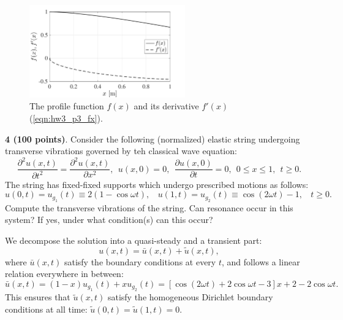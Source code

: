 \begin{figure}[!ht]
    \centering
    \includegraphics[width=0.6\textwidth]{homework/hw3/assets/hw3_p3_fx.pdf}
    \caption{The profile function $f(x)$ and its derivative $f'(x)$ (\cref{eqn:hw3_p3_fx}).}
    \label{fig:hw3_p3_fx}
\end{figure}

\newpage
\begin{problem}
    \textbf{4 (100 points)}. Consider the following (normalized) elastic string undergoing transverse vibrations governed by teh classical wave equation:
    \begin{equation}
        \frac{\partial^2 u(x, t)}{\partial t^2} = \frac{\partial^2 u(x, t)}{\partial x^2}, ~~ u(x, 0) = 0, ~~ \frac{\partial u(x, 0)}{\partial t} = 0, ~~ 0 \leq x \leq 1, ~~ t \geq 0.
    \end{equation}
    The string has fixed-fixed supports which undergo prescribed motions as follows:
    \begin{equation}
        u(0, t) = u_{g_1}(t) \equiv 2(1 - \cos \omega t), ~~~~ u(1, t) = u_{g_2}(t) \equiv \cos (2\omega t) - 1, ~~~~ t \geq 0.
    \end{equation}
    Compute the transverse vibrations of the string. Can resonance occur in this system? If yes, under what condition(s) can this occur?
\end{problem}
We decompose the solution into a quasi-steady and a transient part:
\begin{equation}
    u(x, t) = \bar{u}(x, t) + \tilde{u}(x, t),
\end{equation}
where $\bar{u}(x, t)$ satisfy the boundary conditions at every $t$, and follows a linear relation everywhere in between:
\begin{equation}\label{eqn:hw3_p4_bar_u}
    \bar{u}(x, t) = (1 - x) u_{g_1}(t) + x u_{g_2}(t) = \left[\cos(2\omega t) + 2\cos\omega t - 3\right] x + 2 - 2\cos\omega t.
\end{equation}
This ensures that $\tilde{u}(x, t)$ satisfy the homogeneous Dirichlet boundary conditions at all time: $\tilde{u}(0, t) = \tilde{u}(1, t) = 0$. 
